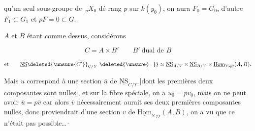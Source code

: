 qu'un seul sous-groupe de $\,{}_pX_0$ dé rang $p$ sur $k(y_0)$, on aura $F_0=G_0$, d'autre  $F_1\subset G_1$ et $pF=0\subset G$.

$A$ et $B$ étant comme dessus, considérons

\[
C=A\times B'\qquad B'\ \text{dual de } B
\]

\[
\text{et}\qquad
\underline{\mathrm{NS}}\deleted{\unsure{C'}}_{C/Y}\ \deleted{\unsure{=}}\simeq\underline{\mathrm{NS}}_{A/Y}\times\underline{\mathrm{NS}}_{B/Y}\times\underline{\mathrm{Hom}}_{Y\text{-gr}}(A,B).
\]

Mais $u$ correspond à une section $\bar{u}$ de $\underline{\mathrm{NS}}_{C/Y}$ [dont les premières deux composantes sont nulles], et sur la fibre  spéciale, on a $\bar{u}_0=p\bar{v}_0$, mais on ne peut avoir $\bar{u}=p\bar{v}$ car alors $\bar{v}$ nécessairement aurait ses deux premières composantes nulles, donc proviendrait d'une section $v$ de $\underline{\mathrm{Hom}}_{Y\text{-gr}}(A,B)$, on a vu que ce n'était pas possible\ldots\,-


